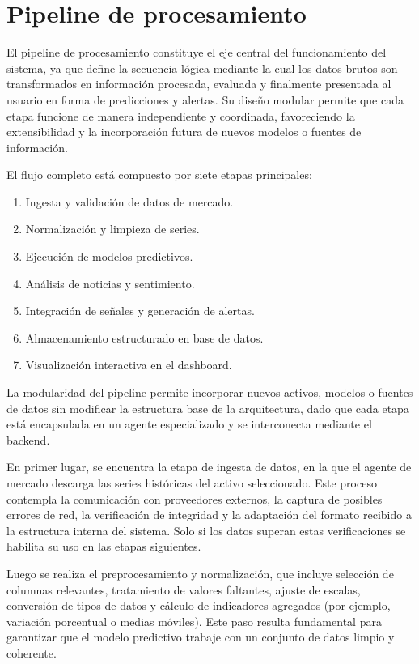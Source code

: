 \section{Pipeline de procesamiento}

El pipeline de procesamiento constituye el eje central del funcionamiento del sistema, ya que define la secuencia lógica mediante la cual los datos brutos son transformados en información procesada, evaluada y finalmente presentada al usuario en forma de predicciones y alertas. Su diseño modular permite que cada etapa funcione de manera independiente y coordinada, favoreciendo la extensibilidad y la incorporación futura de nuevos modelos o fuentes de información.

El flujo completo está compuesto por siete etapas principales:

\begin{enumerate}
    \item Ingesta y validación de datos de mercado.
    \item Normalización y limpieza de series.
    \item Ejecución de modelos predictivos.
    \item Análisis de noticias y sentimiento.
    \item Integración de señales y generación de alertas.
    \item Almacenamiento estructurado en base de datos.
    \item Visualización interactiva en el dashboard.
\end{enumerate}

La modularidad del pipeline permite incorporar nuevos activos, modelos o fuentes de datos sin modificar la estructura base de la arquitectura, dado que cada etapa está encapsulada en un agente especializado y se interconecta mediante el backend.

En primer lugar, se encuentra la etapa de ingesta de datos, en la que el agente de mercado descarga las series históricas del activo seleccionado. Este proceso contempla la comunicación con proveedores externos, la captura de posibles errores de red, la verificación de integridad y la adaptación del formato recibido a la estructura interna del sistema. Solo si los datos superan estas verificaciones se habilita su uso en las etapas siguientes.

Luego se realiza el preprocesamiento y normalización, que incluye selección de columnas relevantes, tratamiento de valores faltantes, ajuste de escalas, conversión de tipos de datos y cálculo de indicadores agregados (por ejemplo, variación porcentual o medias móviles). Este paso resulta fundamental para garantizar que el modelo predictivo trabaje con un conjunto de datos limpio y coherente.

